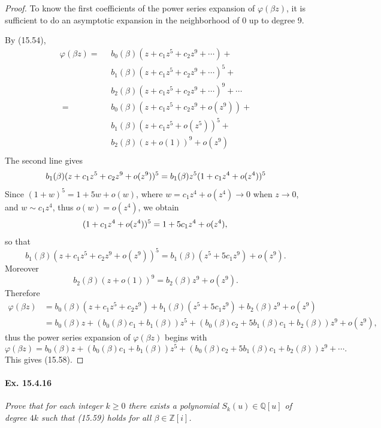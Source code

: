 \documentclass[11pt,a4paper]{article}
\newcommand{\Q}{\mathbb{Q}}
\newcommand{\Z}{\mathbb{Z}}
\begin{document}
\begin{proof} To know the first coefficients of the power series expansion of $\varphi(\beta z)$, it is sufficient to do an asymptotic expansion in the neighborhood of $0$ up to degree 9.

By (15.54),
\begin{align*}
\varphi(\beta z)=\phantom{a}  
& b_0(\beta)(z+c_1z^5+c_2z^9+\cdots)+\\
& b_1(\beta)(z+c_1z^5+c_2z^9+\cdots)^5+\\
& b_2(\beta)(z+c_1z^5+c_2z^9+ \cdots)^9 + \cdots\\
= \phantom{a} 
&b_0(\beta)(z+c_1z^5+c_2z^9+o(z^9))+\\
& b_1(\beta)(z+c_1z^5+o(z^5))^5+\\
& b_2(\beta)(z+o(1))^9 + o(z^9)\\
\end{align*}
The second line gives
$$
b_1(\beta)(z+c_1z^5+c_2z^9+o(z^9))^5 = b_1(\beta) z^5(1+ c_1z^4 + o(z^4))^5\\
$$
Since $(1+w)^5 = 1+5w + o(w)$,  where $w = c_1z^4 + o(z^4) \to 0$ when $z \to 0$, and $w \sim c_1z^4$, thus $o(w) = o(z^4)$, we obtain
$$
(1+ c_1z^4 + o(z^4))^5 = 1+ 5 c_1 z^4 + o(z^4),\\
$$
so that
$$b_1(\beta)(z+c_1z^5+c_2z^9+o(z^9))^5 = b_1(\beta)(z^5 + 5c_1 z^9) + o(z^9).$$
Moreover
$$b_2(\beta)(z+o(1))^9 = b_2(\beta)z^9 + o(z^9).$$
Therefore
\begin{align*}
\varphi(\beta z)&=b_0(\beta)(z+c_1z^5+c_2z^9) + b_1(\beta)(z^5 + 5c_1 z^9)  + b_2(\beta)z^9 +o(z^9)\\
&=b_0(\beta)z + (b_0(\beta) c_1 + b_1(\beta))z^5 + (b_0(\beta) c_2 + 5 b_1(\beta) c_1 + b_2(\beta)) z^9 +o(z^9),
\end{align*}
thus the power series expansion of $\varphi(\beta z)$ begins with
$$\varphi(\beta z) = b_0(\beta)z + (b_0(\beta) c_1 + b_1(\beta))z^5 + (b_0(\beta) c_2 + 5 b_1(\beta) c_1 + b_2(\beta)) z^9 + \cdots.$$
This gives (15.58).
\end{proof}

\paragraph{Ex. 15.4.16}{\it  Prove that for each integer $k\geq 0$ there exists a polynomial $S_k(u) \in \Q[u]$ of degree $4k$ such that (15.59) holds for all $\beta \in \Z[i]$.
}
\end{document}
